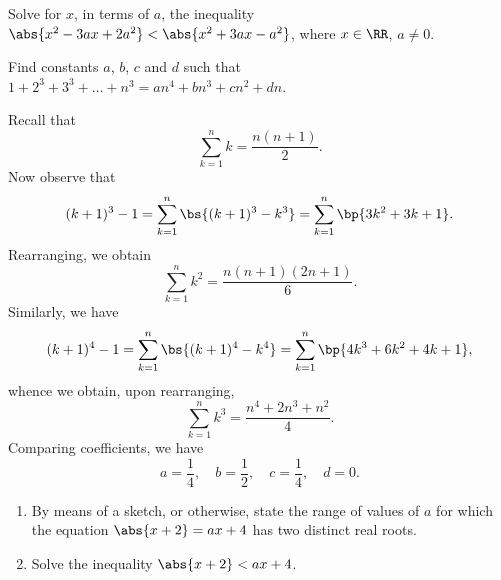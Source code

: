 \begin{problem}[\chili]
    Solve for $x$, in terms of $a$, the inequality $\abs{x^2 - 3ax + 2a^2} < \abs{x^2 + 3ax - a^2}$, where $x \in \RR$, $a \neq 0$.
\end{problem}

\begin{problem}[\chili]
    Find constants $a$, $b$, $c$ and $d$ such that $1 + 2^3 + 3^3 + \dots + n^3 = an^4 + bn^3 + cn^2 + dn$.
\end{problem}
\begin{solution}
    Recall that \[\sum_{k = 1}^n k = \frac{n(n+1)}{2}.\] Now observe that \[(k+1)^3 - 1 = \sum_{k = 1}^n \bs{(k+1)^3 - k^3} = \sum_{k = 1}^n \bp{3k^2 + 3k + 1}.\] Rearranging, we obtain \[\sum_{k = 1}^n k^2 = \frac{n(n+1)(2n+1)}6.\] Similarly, we have \[(k+1)^4 - 1 = \sum_{k = 1}^n \bs{(k+1)^4 - k^4} = \sum_{k = 1}^n \bp{4k^3 + 6k^2 + 4k + 1},\] whence we obtain, upon rearranging, \[\sum_{k = 1}^n k^3 = \frac{n^4 + 2n^3 + n^2}{4}.\] Comparing coefficients, we have \[a = \frac14, \quad b = \frac12, \quad c = \frac14, \quad d = 0.\]
\end{solution}

\begin{problem}[\chili]
    \begin{enumerate}
        \item By means of a sketch, or otherwise, state the range of values of $a$ for which the equation $\abs{x + 2} = ax + 4$ has two distinct real roots.
        \item Solve the inequality $\abs{x + 2} < ax + 4$.
    \end{enumerate}
\end{problem}